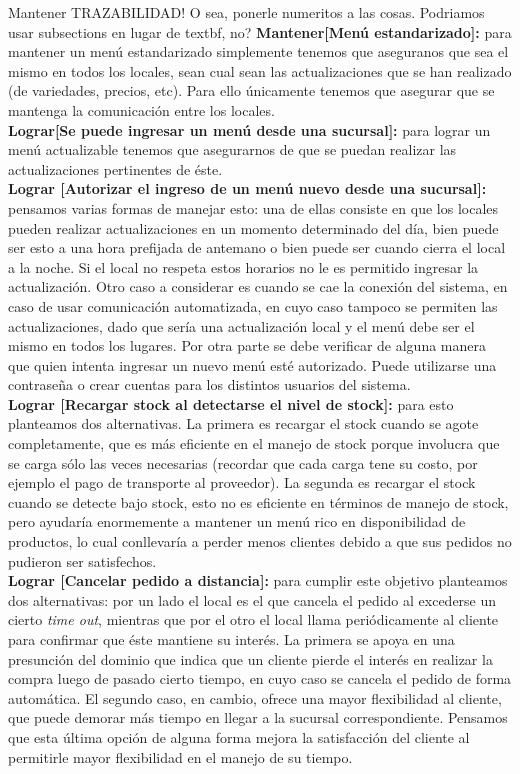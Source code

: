 \documentclass[a4paper,10pt]{article}
\begin{document}
Mantener TRAZABILIDAD! O sea, ponerle numeritos a las cosas.
Podriamos usar subsections en lugar de textbf, no?
\textbf{Mantener[Menú estandarizado]:} para mantener un menú estandarizado simplemente tenemos que aseguranos que sea el mismo en todos los locales, sean cual sean las actualizaciones que se han realizado (de variedades, precios, etc). Para ello únicamente tenemos que asegurar que se mantenga la comunicación entre los locales. \\
\textbf{Lograr[Se puede ingresar un menú desde una sucursal]:} para lograr un menú actualizable tenemos que asegurarnos de que se puedan realizar las actualizaciones pertinentes de éste. \\
\textbf{Lograr [Autorizar el ingreso de un menú nuevo desde una sucursal]:} pensamos varias formas de manejar esto: una de ellas consiste en que los locales pueden realizar actualizaciones en un momento determinado del día, bien puede ser esto a una hora prefijada de antemano o bien puede ser cuando cierra el local a la noche. Si el local no respeta estos horarios no le es permitido ingresar la actualización. Otro caso a considerar es cuando se cae la conexión del sistema, en caso de usar comunicación automatizada, en cuyo caso tampoco se permiten las actualizaciones, dado que sería una actualización local y el menú debe ser el mismo en todos los lugares. Por otra parte se debe verificar de alguna manera que quien intenta ingresar un nuevo menú esté autorizado. Puede utilizarse una contraseña o crear cuentas para los distintos usuarios del sistema. \\
\textbf{Lograr [Recargar stock al detectarse el nivel de stock]:} para esto planteamos dos alternativas. La primera es recargar el stock cuando se agote completamente, que es más eficiente en el manejo de stock porque involucra que se carga sólo las veces necesarias (recordar que cada carga tene su costo, por ejemplo el pago de transporte al proveedor). La segunda es recargar el stock cuando se detecte bajo stock, esto no es eficiente en términos de manejo de stock, pero ayudaría enormemente a mantener un menú rico en disponibilidad de productos, lo cual conllevaría a perder menos clientes debido a que sus pedidos no pudieron ser satisfechos.\\
\textbf{Lograr [Cancelar pedido a distancia]:} para cumplir este objetivo planteamos dos alternativas: por un lado el local es el que cancela el pedido al excederse un cierto \textit{time out}, mientras que por el otro el local llama periódicamente al cliente para confirmar que éste mantiene su interés. La primera se apoya en una presunción del dominio que indica que un cliente pierde el interés en realizar la compra luego de pasado cierto tiempo, en cuyo caso se cancela el pedido de forma automática. El segundo caso, en cambio, ofrece una mayor flexibilidad al cliente, que puede demorar más tiempo en llegar a la sucursal correspondiente. Pensamos que esta última opción de alguna forma mejora la satisfacción del cliente al permitirle mayor flexibilidad en el manejo de su tiempo.\\
\end{document}
